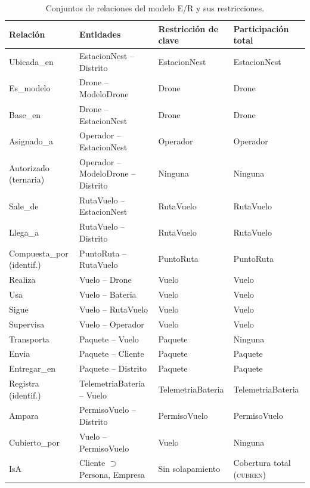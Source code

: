 \documentclass[11pt,a4paper]{article}
\begin{document}
\begin{table}[H]
\centering\small
\caption{Conjuntos de relaciones del modelo E/R y sus restricciones.}
\label{tab:rel}
\setlength{\tabcolsep}{5pt}
\begin{tabularx}{\textwidth}{@{}l l l X@{}}
\toprule
Relación & Entidades & Restricción de clave & Participación total \\
\midrule
Ubicada\_en & EstacionNest -- Distrito & EstacionNest & EstacionNest \\
Es\_modelo & Drone -- ModeloDrone & Drone & Drone \\
Base\_en & Drone -- EstacionNest & Drone & Drone \\
Asignado\_a & Operador -- EstacionNest & Operador & Operador \\
Autorizado (ternaria) & Operador -- ModeloDrone -- Distrito & Ninguna & Ninguna \\
Sale\_de & RutaVuelo -- EstacionNest & RutaVuelo & RutaVuelo \\
Llega\_a & RutaVuelo -- Distrito & RutaVuelo & RutaVuelo \\
Compuesta\_por (identif.) & PuntoRuta -- RutaVuelo & PuntoRuta & PuntoRuta \\
Realiza & Vuelo -- Drone & Vuelo & Vuelo \\
Usa & Vuelo -- Bateria & Vuelo & Vuelo \\
Sigue & Vuelo -- RutaVuelo & Vuelo & Vuelo \\
Supervisa & Vuelo -- Operador & Vuelo & Vuelo \\
Transporta & Paquete -- Vuelo & Paquete & Ninguna \\
Envia & Paquete -- Cliente & Paquete & Paquete \\
Entregar\_en & Paquete -- Distrito & Paquete & Paquete \\
Registra (identif.) & TelemetriaBateria -- Vuelo & TelemetriaBateria & TelemetriaBateria \\
Ampara & PermisoVuelo -- Distrito & PermisoVuelo & PermisoVuelo \\
Cubierto\_por & Vuelo -- PermisoVuelo & Vuelo & Ninguna \\
\midrule
IsA & Cliente $\supset$ Persona, Empresa & Sin solapamiento & Cobertura total (\textsc{cubren}) \\
\bottomrule
\end{tabularx}
\end{table}
\end{document}

